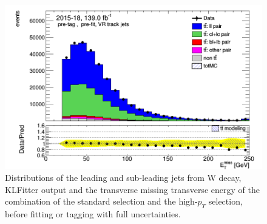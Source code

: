 \documentclass[letterpaper,12pt]{article}
\begin{document}
\begin{figure}
\begin{minipage}[b]{.45\textwidth}
\end{minipage}\hfill
\begin{minipage}[b]{.45\textwidth}
\centering
\includegraphics[width=1\textwidth]{Oct_distributions/pretagNoRwDL1rwithhighpTVRJets_scaledall/DataMC_MET.png}
\end{minipage}
\caption{Distributions of the leading and sub-leading jets from W decay, KLFitter output and the transverse missing transverse energy of the combination of the standard selection and the high-$p_T$ selection, before fitting or tagging with full uncertainties.} \label{fig:jets_VRJets}
\end{figure}
\end{document}
